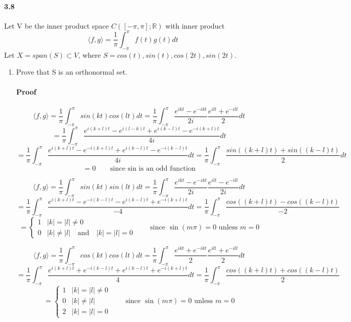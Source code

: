 \documentclass[letterpaper,12pt]{article}
\theoremstyle{definition}
\begin{document}
\paragraph{3.8} Let V be the inner product space $C([-\pi,\pi];\mathds{R})$ with inner product $$\langle f , g  \rangle  = \frac{1}{\pi} \int_{- \pi}^{\pi} f(t) g(t) dt $$
Let $X = span(S) \subset V$, where $ S = {cos(t), sin(t), cos(2t), sin(2t)}$.
\begin{enumerate}[label=(\roman*)]

\item Prove that S is an orthonormal set.
\paragraph{Proof}
$$\langle f , g  \rangle  = \frac{1}{\pi} \int_{- \pi}^{\pi} sin(kt) cos(lt) dt  = \frac{1}{\pi} \int_{- \pi}^{\pi} \frac{e^{ikt} - e^{-ikt}}{2i} \frac{e^{ilt} + e^{-ilt}}{2} dt $$ $$= \frac{1}{\pi} \int_{- \pi}^{\pi} \frac{  e^{i(k+l)t} - e^{i(l-k)t} + e^{i(k-l)t} - e^{-i(k + l)t}}{4i} dt $$ 
$$= \frac{1}{\pi} \int_{- \pi}^{\pi} \frac{  e^{i(k+l)t} - e^{-i(k + l)t} + e^{i(k-l)t} - e^{-i(k-l)t}  }{4i} dt = \frac{1}{\pi} \int_{- \pi}^{\pi} \frac{  sin((k+l)t) + sin((k-l)t) }{2} dt$$
$$= 0 \qquad \text{since sin is an odd function}$$

$$\langle f , g  \rangle  = \frac{1}{\pi} \int_{- \pi}^{\pi} sin(kt) sin(lt) dt  = \frac{1}{\pi} \int_{- \pi}^{\pi} \frac{e^{ikt} - e^{-ikt}}{2i} \frac{e^{ilt} - e^{-ilt}}{2i} dt $$
$$= \frac{1}{\pi} \int_{- \pi}^{\pi} \frac{  e^{i(k+l)t} - e^{-i(k-l)t} - e^{i(k-l)t} + e^{-i(k+l)t}}{-4} dt 
= \frac{1}{\pi} \int_{- \pi}^{\pi} \frac{  cos((k+l)t) - cos((k-l)t) }{-2} $$
$$ = \begin{cases}
1 & \vert k \vert =  \vert l \vert \neq 0 \\
0 & \vert k \vert \neq \vert l \vert \quad \text{and}\quad \vert k \vert =  \vert l \vert = 0 
\end{cases} 
\qquad \text{since $\sin(m\pi) = 0$ unless $m = 0$}$$ 

$$\langle f , g  \rangle  = \frac{1}{\pi} \int_{- \pi}^{\pi} cos(kt) cos(lt) dt  = \frac{1}{\pi} \int_{- \pi}^{\pi} \frac{e^{ikt} + e^{-ikt}}{2} \frac{e^{ilt} + e^{-ilt}}{2} dt $$
$$= \frac{1}{\pi} \int_{- \pi}^{\pi} \frac{  e^{i(k+l)t} + e^{-i(k-l)t} + e^{i(k-l)t} + e^{-i(k+l)t}}{4} dt 
= \frac{1}{\pi} \int_{- \pi}^{\pi} \frac{  cos((k+l)t) + cos((k-l)t) }{2}$$ 
$$ = \begin{cases}
1 & \vert k \vert =  \vert l \vert \neq 0 \\
0 & \vert k \vert \neq \vert l \vert \\
2 & \vert k \vert =  \vert l \vert = 0 
\end{cases} 
\qquad \text{since $\sin(m\pi) = 0$ unless $m = 0$}$$ 


\end{enumerate}
\end{document}
